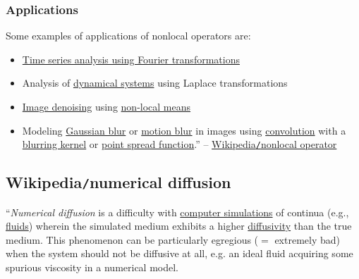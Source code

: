 \documentclass{article}
\begin{document}
\subsubsection{Applications}
Some examples of applications of nonlocal operators are:
\begin{itemize}
	\item \href{https://en.wikipedia.org/wiki/Time_series}{Time series analysis using Fourier transformations}
	\item Analysis of \href{https://en.wikipedia.org/wiki/Dynamical_systems}{dynamical systems} using Laplace transformations
	\item \href{https://en.wikipedia.org/wiki/Image_denoising}{Image denoising} using \href{https://en.wikipedia.org/wiki/Non-local_means}{non-local means}
	\item Modeling \href{https://en.wikipedia.org/wiki/Gaussian_blur}{Gaussian blur} or \href{https://en.wikipedia.org/wiki/Motion_blur}{motion blur} in images using \href{https://en.wikipedia.org/wiki/Convolution}{convolution} with a \href{https://en.wikipedia.org/wiki/Kernel_(image_processing)}{blurring kernel} or \href{https://en.wikipedia.org/wiki/Point_spread_function}{point spread function}.'' -- \href{https://en.wikipedia.org/wiki/Nonlocal_operator}{Wikipedia{\tt/}nonlocal operator}
\end{itemize}


\subsection{Wikipedia{\tt/}numerical diffusion}
``{\it Numerical diffusion} is a difficulty with \href{https://en.wikipedia.org/wiki/Computer_simulation}{computer simulations} of continua (e.g., \href{https://en.wikipedia.org/wiki/Fluid}{fluids}) wherein the simulated medium exhibits a higher \href{https://en.wikipedia.org/wiki/Eddy_diffusion}{diffusivity} than the true medium. This phenomenon can be particularly egregious ($=$ extremely bad) when the system should not be diffusive at all, e.g. an ideal fluid acquiring some spurious viscosity in a numerical model.
\end{document}
